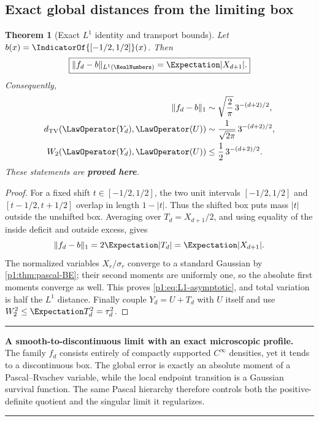 \documentclass[11pt,oneside]{article}
\numberwithin{equation}{section}
\newtheorem{theorem}{Theorem}[section]
\theoremstyle{definition}
\theoremstyle{remark}
\newcommand{\statusproved}{\textcolor{deepgreen}{\textbf{proved here}}}
\newenvironment{resultbox}[1]{%
  \par\medskip\noindent\begin{center}\begin{minipage}{0.94\textwidth}%
  \color{deepgreen}\hrule\vspace{0.65em}%
  \color{black}\textbf{\color{deepgreen}#1.}\ }{%
  \par\vspace{0.65em}\color{deepgreen}\hrule
  \end{minipage}\end{center}\medskip}
\begin{document}
\subsection{Exact global distances from the limiting box}

\begin{theorem}[Exact $L^1$ identity and transport bounds]
\label{p1:thm:global-box-distance}
Let $b(x)=\IndicatorOf{[-1/2,1/2]}(x)$.  Then
\begin{equation}
 \boxed{
 \|f_d-b\|_{L^1(\RealNumbers)}
 =\Expectation|X_{d+1}|.}
 \label{p1:eq:L1-exact}
\end{equation}
Consequently,
\begin{align}
 \|f_d-b\|_1
 &\sim\sqrt{\frac2\pi}\,3^{-(d+2)/2},
 \label{p1:eq:L1-asymptotic}\\
 d_{\rm TV}(\LawOperator(Y_d),\LawOperator(U))
 &\sim\frac1{\sqrt{2\pi}}\,3^{-(d+2)/2},
 \label{p1:eq:TV-asymptotic}\\
 W_2(\LawOperator(Y_d),\LawOperator(U))
 &\le\frac12\,3^{-(d+2)/2}.
 \label{p1:eq:W2-bound}
\end{align}
These statements are \statusproved.
\end{theorem}

\begin{proof}
For a fixed shift $t\in[-1/2,1/2]$, the two unit intervals
$[-1/2,1/2]$ and $[t-1/2,t+1/2]$ overlap in length $1-|t|$.  Thus the shifted box puts mass
$|t|$ outside the unshifted box.  Averaging over $T_d=X_{d+1}/2$, and using equality of the
inside deficit and outside excess, gives
\[
 \|f_d-b\|_1=2\Expectation|T_d|=\Expectation|X_{d+1}|.
\]
The normalized variables $X_r/\sigma_r$ converge to a standard Gaussian by
\cref{p1:thm:pascal-BE}; their second moments are uniformly one, so the absolute first moments
converge as well.  This proves \eqref{p1:eq:L1-asymptotic}, and total variation is half the
$L^1$ distance.  Finally couple $Y_d=U+T_d$ with $U$ itself and use
$W_2^2\le\Expectation T_d^2=\tau_d^2$.
\end{proof}

\begin{resultbox}{A smooth-to-discontinuous limit with an exact microscopic profile}
The family $f_d$ consists entirely of compactly supported $C^\infty$ densities, yet it tends
to a discontinuous box.  The global error is exactly an absolute moment of a Pascal--Rvachev
variable, while the local endpoint transition is a Gaussian survival function.  The same
Pascal hierarchy therefore controls both the positive-definite quotient and the singular
limit it regularizes.
\end{resultbox}
\end{document}
